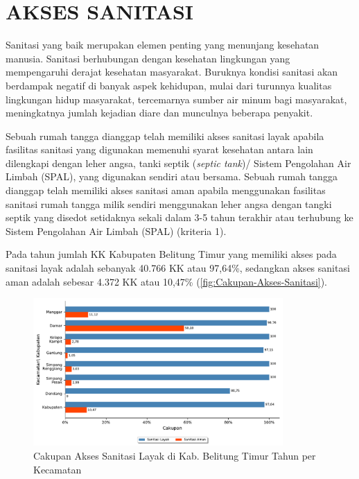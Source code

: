 \section{AKSES SANITASI}
Sanitasi yang baik merupakan elemen penting yang menunjang kesehatan manusia.
Sanitasi berhubungan dengan kesehatan lingkungan yang mempengaruhi derajat kesehatan masyarakat. 
Buruknya kondisi sanitasi akan berdampak negatif di banyak aspek kehidupan, mulai dari turunnya kualitas lingkungan hidup masyarakat, tercemarnya sumber air minum bagi masyarakat, meningkatnya jumlah kejadian diare dan munculnya beberapa penyakit. 

Sebuah rumah tangga dianggap telah memiliki akses sanitasi layak apabila fasilitas sanitasi yang digunakan memenuhi syarat kesehatan antara lain dilengkapi dengan leher angsa, tanki septik (\emph{septic tank})/ Sistem Pengolahan Air Limbah (SPAL), yang digunakan sendiri atau bersama.
Sebuah rumah tangga dianggap telah memiliki akses sanitasi aman apabila menggunakan fasilitas sanitasi rumah tangga milik sendiri menggunakan leher angsa dengan tangki septik yang
disedot setidaknya sekali dalam 3-5 tahun terakhir atau terhubung ke Sistem Pengolahan Air Limbah (SPAL) (kriteria 1).

Pada tahun \tP jumlah KK Kabupaten Belitung Timur yang memiliki akses pada
sanitasi layak adalah sebanyak 40.766 KK atau 97,64\%, sedangkan akses sanitasi aman adalah sebesar 4.372 KK atau 10,47\% (\autoref{fig:Cakupan-Akses-Sanitasi}).

\begin{figure}[H]
	\centering
    \includegraphics[width=0.85\textwidth]{bab_07/bab_07_02_aksesSanitasi}
	\caption{Cakupan Akses Sanitasi Layak di Kab. Belitung Timur Tahun \tP per Kecamatan}
	\label{fig:Cakupan-Akses-Sanitasi}
\end{figure}

